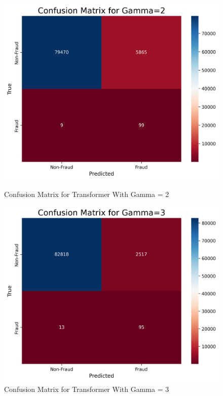 \documentclass[11pt, oneside]{article}   	%
\begin{document}
\begin{figure}[H]
    \centering
    \begin{minipage}{0.49\textwidth}
        \centering
        \includegraphics[width=1.0\textwidth]{images/confusion_matrix_transformer_2.png}
        \caption{Confusion Matrix for Transformer With Gamma = 2}
        \label{fig:confusion_matrix_transformer_2}
    \end{minipage}\hfill
    \begin{minipage}{0.49\textwidth}
        \centering
        \includegraphics[width=1.0\textwidth]{images/confusion_matrix_transformer_3.png}
        \caption{Confusion Matrix for Transformer With Gamma = 3}
        \label{fig:confusion_matrix_transformer_3}
    \end{minipage}
\end{figure}
\end{document}
